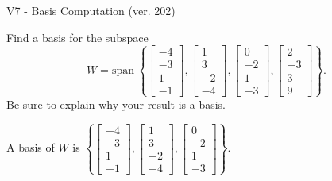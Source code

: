 \begin{exercise}
  \begin{exerciseTitle}V7 - Basis Computation (ver. 202)\end{exerciseTitle}
  \begin{exerciseStatement}
    Find a basis for the subspace 
\[W=\mathrm{span}\ \left\{\left[\begin{array}{r}
-4 \\
-3 \\
1 \\
-1
\end{array}\right] , \left[\begin{array}{r}
1 \\
3 \\
-2 \\
-4
\end{array}\right] , \left[\begin{array}{r}
0 \\
-2 \\
1 \\
-3
\end{array}\right] , \left[\begin{array}{r}
2 \\
-3 \\
3 \\
9
\end{array}\right]\right\}.\]
 Be sure to explain why your result is a basis.


  \end{exerciseStatement}
  \begin{exerciseAnswer}
   A basis of \(W\) is  \(\left\{\left[\begin{array}{r}
-4 \\
-3 \\
1 \\
-1
\end{array}\right] , \left[\begin{array}{r}
1 \\
3 \\
-2 \\
-4
\end{array}\right] , \left[\begin{array}{r}
0 \\
-2 \\
1 \\
-3
\end{array}\right]\right\}\).
  


  \end{exerciseAnswer}
\end{exercise}